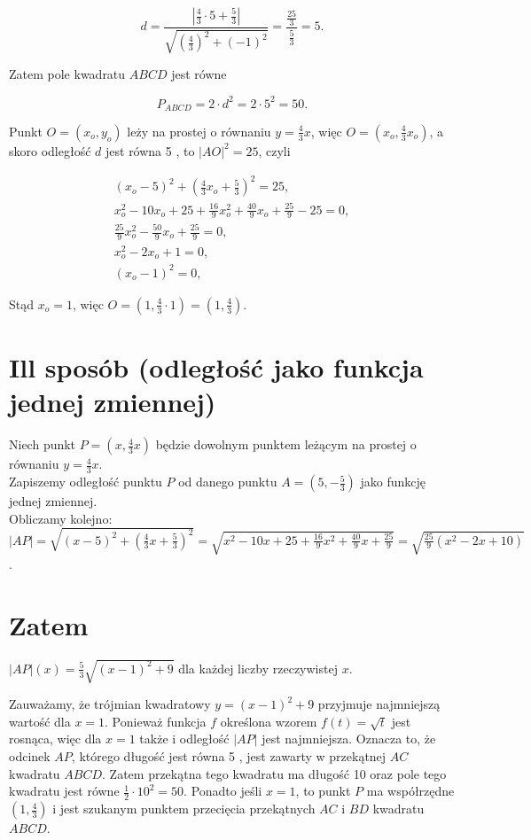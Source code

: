 \documentclass[10pt]{article}
\begin{document}
$$
d=\frac{\left|\frac{4}{3} \cdot 5+\frac{5}{3}\right|}{\sqrt{\left(\frac{4}{3}\right)^{2}+(-1)^{2}}}=\frac{\frac{25}{3}}{\frac{5}{3}}=5 .
$$

Zatem pole kwadratu $A B C D$ jest równe

$$
P_{A B C D}=2 \cdot d^{2}=2 \cdot 5^{2}=50 .
$$

Punkt $O=\left(x_{o}, y_{o}\right)$ leży na prostej o równaniu $y=\frac{4}{3} x$, więc $O=\left(x_{o}, \frac{4}{3} x_{o}\right)$, a skoro odległość $d$ jest równa 5 , to $|A O|^{2}=25$, czyli

$$
\begin{gathered}
\left(x_{o}-5\right)^{2}+\left(\frac{4}{3} x_{o}+\frac{5}{3}\right)^{2}=25, \\
x_{o}^{2}-10 x_{o}+25+\frac{16}{9} x_{o}^{2}+\frac{40}{9} x_{o}+\frac{25}{9}-25=0, \\
\frac{25}{9} x_{o}^{2}-\frac{50}{9} x_{o}+\frac{25}{9}=0, \\
x_{o}^{2}-2 x_{o}+1=0, \\
\left(x_{o}-1\right)^{2}=0,
\end{gathered}
$$

Stąd $x_{o}=1$, więc $O=\left(1, \frac{4}{3} \cdot 1\right)=\left(1, \frac{4}{3}\right)$.

\section*{Ill sposób (odległość jako funkcja jednej zmiennej)}
Niech punkt $P=\left(x, \frac{4}{3} x\right)$ będzie dowolnym punktem leżącym na prostej o równaniu $y=\frac{4}{3} x$.\\
Zapiszemy odległość punktu $P$ od danego punktu $A=\left(5,-\frac{5}{3}\right)$ jako funkcję jednej zmiennej.\\
Obliczamy kolejno:\\
$|A P|=\sqrt{(x-5)^{2}+\left(\frac{4}{3} x+\frac{5}{3}\right)^{2}}=\sqrt{x^{2}-10 x+25+\frac{16}{9} x^{2}+\frac{40}{9} x+\frac{25}{9}}=\sqrt{\frac{25}{9}\left(x^{2}-2 x+10\right)}$.

\section*{Zatem}
$|A P|(x)=\frac{5}{3} \sqrt{(x-1)^{2}+9}$ dla każdej liczby rzeczywistej $x$.

Zauważamy, że trójmian kwadratowy $y=(x-1)^{2}+9$ przyjmuje najmniejszą wartość dla $x=1$. Ponieważ funkcja $f$ określona wzorem $f(t)=\sqrt{t}$ jest rosnąca, więc dla $x=1$ także i odległość $|A P|$ jest najmniejsza. Oznacza to, że odcinek $A P$, którego długość jest równa 5 , jest zawarty w przekątnej $A C$ kwadratu $A B C D$. Zatem przekątna tego kwadratu ma długość 10 oraz pole tego kwadratu jest równe $\frac{1}{2} \cdot 10^{2}=50$. Ponadto jeśli $x=1$, to punkt $P$ ma współrzędne $\left(1, \frac{4}{3}\right)$ i jest szukanym punktem przecięcia przekątnych $A C$ i $B D$ kwadratu $A B C D$.
\end{document}
